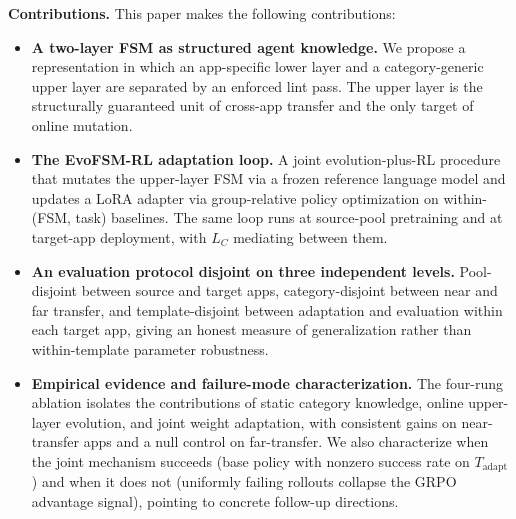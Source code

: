 \medskip
\noindent\textbf{Contributions.} This paper makes the following contributions:
\begin{itemize}
    \item \textbf{A two-layer FSM as structured agent knowledge.} We propose a representation in which an app-specific lower layer and a category-generic upper layer are separated by an enforced lint pass. The upper layer is the structurally guaranteed unit of cross-app transfer and the only target of online mutation.

    \item \textbf{The EvoFSM-RL adaptation loop.} A joint evolution-plus-RL procedure that mutates the upper-layer FSM via a frozen reference language model and updates a LoRA adapter via group-relative policy optimization on within-(FSM, task) baselines. The same loop runs at source-pool pretraining and at target-app deployment, with $L_C$ mediating between them.

    \item \textbf{An evaluation protocol disjoint on three independent levels.} Pool-disjoint between source and target apps, category-disjoint between near and far transfer, and template-disjoint between adaptation and evaluation within each target app, giving an honest measure of generalization rather than within-template parameter robustness.

    \item \textbf{Empirical evidence and failure-mode characterization.} The four-rung ablation isolates the contributions of static category knowledge, online upper-layer evolution, and joint weight adaptation, with consistent gains on near-transfer apps and a null control on far-transfer. We also characterize when the joint mechanism succeeds (base policy with nonzero success rate on $T_{\text{adapt}}$) and when it does not (uniformly failing rollouts collapse the GRPO advantage signal), pointing to concrete follow-up directions.
\end{itemize}
